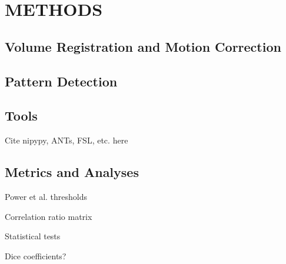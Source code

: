 \chapter{METHODS}

\section{Volume Registration and Motion Correction}

\section{Pattern Detection}

\section{Tools}

Cite nipypy, ANTs, FSL, etc. here

\section{Metrics and Analyses}

Power et al. thresholds

Correlation ratio matrix

Statistical tests

Dice coefficients?